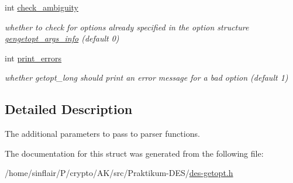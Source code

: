 \begin{DoxyCompactItemize}
\mbox{\label{structcmdline__parser__params_a6e4442704fc40b0b655f7cc602f13ec4}} 
int \hyperlink{structcmdline__parser__params_a6e4442704fc40b0b655f7cc602f13ec4}{check\+\_\+ambiguity}
\begin{DoxyCompactList}\small\item\em whether to check for options already specified in the option structure \hyperlink{structgengetopt__args__info}{gengetopt\+\_\+args\+\_\+info} (default 0) \end{DoxyCompactList}\item 
\mbox{\label{structcmdline__parser__params_a3236f066777488e8502abe05ccd24455}} 
int \hyperlink{structcmdline__parser__params_a3236f066777488e8502abe05ccd24455}{print\+\_\+errors}
\begin{DoxyCompactList}\small\item\em whether getopt\+\_\+long should print an error message for a bad option (default 1) \end{DoxyCompactList}\end{DoxyCompactItemize}


\subsection{Detailed Description}
The additional parameters to pass to parser functions. 

The documentation for this struct was generated from the following file\+:\begin{DoxyCompactItemize}
\item 
/home/sinflair/\+P/crypto/\+A\+K/src/\+Praktikum-\/\+D\+E\+S/\hyperlink{des-getopt_8h}{des-\/getopt.\+h}\end{DoxyCompactItemize}
